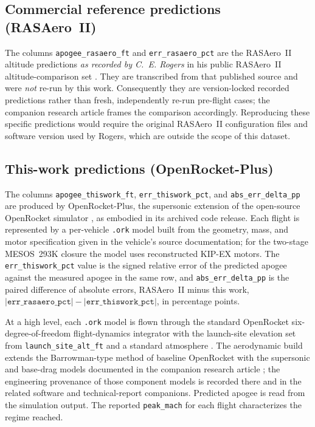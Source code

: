 \subsection{Commercial reference predictions (RASAero~II)}

The columns \texttt{apogee\_rasaero\_ft} and \texttt{err\_rasaero\_pct} are the
RASAero~II \cite{rogers2015} altitude predictions \emph{as recorded by C.~E. Rogers}
in his public RASAero~II altitude-comparison set
\cite{rogers_rasaero_alt}. They are transcribed from that published source and were
\emph{not} re-run by this work. Consequently they are version-locked recorded
predictions rather than fresh, independently re-run pre-flight cases; the companion
research article \cite{yu2026jsr} frames the comparison accordingly. Reproducing
these specific predictions would require the original RASAero~II configuration files
and software version used by Rogers, which are outside the scope of this dataset.

\subsection{This-work predictions (OpenRocket-Plus)}

The columns \texttt{apogee\_thiswork\_ft}, \texttt{err\_thiswork\_pct}, and
\texttt{abs\_err\_delta\_pp} are produced by OpenRocket-Plus, the supersonic
extension of the open-source OpenRocket simulator \cite{niskanen2009}, as embodied
in its archived code release. Each flight is represented by a per-vehicle
\texttt{.ork} model built from the geometry, mass, and motor specification given in
the vehicle's source documentation; for the two-stage MESOS~293K closure the model
uses reconstructed KIP-EX motors. The \texttt{err\_thiswork\_pct} value is the
signed relative error of the predicted apogee against the measured apogee in the
same row, and \texttt{abs\_err\_delta\_pp} is the paired difference of absolute
errors, RASAero~II minus this work,
$\lvert\texttt{err\_rasaero\_pct}\rvert -
\lvert\texttt{err\_thiswork\_pct}\rvert$, in percentage points.

At a high level, each \texttt{.ork} model is flown through the standard OpenRocket
six-degree-of-freedom flight-dynamics integrator with the launch-site elevation set
from \texttt{launch\_site\_alt\_ft} and a standard atmosphere
\cite{nasa1976ussa}. The aerodynamic build extends the Barrowman-type method
\cite{barrowman1967} of baseline OpenRocket \cite{niskanen2009} with the supersonic
and base-drag models documented in the companion research article
\cite{yu2026jsr}; the engineering provenance of those component models is recorded
there and in the related software and technical-report companions. Predicted
apogee is read from the simulation output. The reported \texttt{peak\_mach} for each
flight characterizes the regime reached.

